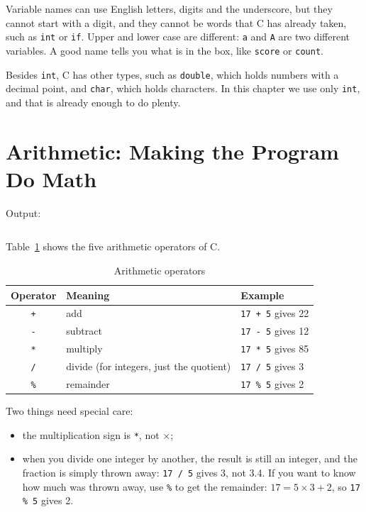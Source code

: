Variable names can use English letters, digits and the underscore, but they cannot start with a digit, and they cannot be words that C has already taken, such as \texttt{int} or \texttt{if}. Upper and lower case are different: \texttt{a} and \texttt{A} are two different variables. A good name tells you what is in the box, like \texttt{score} or \texttt{count}.

Besides \texttt{int}, C has other types, such as \texttt{double}, which holds numbers with a decimal point, and \texttt{char}, which holds characters. In this chapter we use only \texttt{int}, and that is already enough to do plenty.

\section{Arithmetic: Making the Program Do Math}
\label{sec:arith}


Output:
\inputminted[linenos=false]{text}{code/en/ch02/out/arith.txt}

Table~\ref{tab:arith} shows the five arithmetic operators of C.

\begin{table}[htbp]
  \centering
  \caption{Arithmetic operators}
  \label{tab:arith}
  \small
  \begin{tabular}{cll}
    \toprule
    Operator & Meaning & Example \\
    \midrule
    \texttt{+} & add & \texttt{17 + 5} gives 22 \\
    \texttt{-} & subtract & \texttt{17 - 5} gives 12 \\
    \texttt{*} & multiply & \texttt{17 * 5} gives 85 \\
    \texttt{/} & divide (for integers, just the quotient) & \texttt{17 / 5} gives 3 \\
    \texttt{\%} & remainder & \texttt{17 \% 5} gives 2 \\
    \bottomrule
  \end{tabular}
\end{table}

Two things need special care:
\begin{itemize}
  \item the multiplication sign is \texttt{*}, not $\times$;
  \item when you divide one integer by another, the result is still an integer, and the fraction is simply thrown away: \texttt{17 / 5} gives 3, not 3.4. If you want to know how much was thrown away, use \texttt{\%} to get the remainder: $17 = 5 \times 3 + 2$, so \texttt{17 \% 5} gives 2.
\end{itemize}

